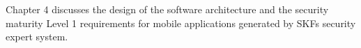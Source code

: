 Chapter 4 discusses the design of the software architecture and the security maturity Level 1 requirements for mobile applications generated by SKFs security expert system.
